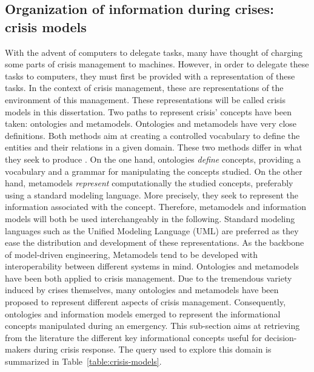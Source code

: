 \subsection{Organization of information during crises: crisis models}
\label{sec:lit-information-models}
With the advent of computers to delegate tasks, many have thought of charging some parts of crisis management to machines.
However, in order to delegate these tasks to computers, they must first be provided with a representation of these tasks.
In the context of crisis management, these are representations of the environment of this management.
These representations will be called crisis models in this dissertation.
Two paths to represent crisis' concepts have been taken: ontologies and metamodels.
Ontologies and metamodels have very close definitions.
Both methods aim at creating a controlled vocabulary to define the entities and their relations in a given domain.
These two methods differ in what they seek to produce \parencite{assmannOntologiesMetamodelsModeldriven2006}.
On the one hand, ontologies \emph{define} concepts, providing a vocabulary and a grammar for manipulating the concepts studied.
On the other hand, metamodels \emph{represent} computationally the studied concepts, preferably using a standard modeling language.
More precisely, they seek to represent the information associated with the concept.
Therefore, metamodels and information models will both be used interchangeably in the following.
Standard modeling languages such as the Unified Modeling Language (UML) are preferred as they ease the distribution and development of these representations.
As the backbone of model-driven engineering, Metamodels tend to be developed with interoperability between different systems in mind.
Ontologies and metamodels have been both applied to crisis management.
Due to the tremendous variety induced by crises themselves, many ontologies and metamodels have been proposed to represent different aspects of crisis management.
Consequently, ontologies and information models emerged to represent the informational concepts manipulated during an emergency.
This sub-section aims at retrieving from the literature the different key informational concepts useful for decision-makers during crisis response.
The query used to explore this domain is summarized in Table~\ref{table:crisis-models}.

